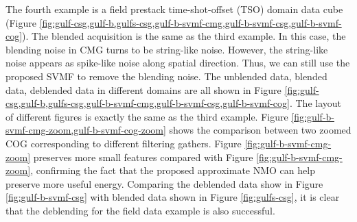 

The fourth example is a field prestack time-shot-offset (TSO) domain data cube (Figure \ref{fig:gulf-csg,gulf-b,gulfs-csg,gulf-b-svmf-cmg,gulf-b-svmf-csg,gulf-b-svmf-cog}).  The blended acquisition is the same as the third example. In this case, the blending noise in CMG turns to be string-like noise. However, the string-like noise appears as spike-like noise along spatial direction. Thus, we can still use the proposed SVMF to remove the blending noise. The unblended data, blended data, deblended data in different domains are all shown in Figure \ref{fig:gulf-csg,gulf-b,gulfs-csg,gulf-b-svmf-cmg,gulf-b-svmf-csg,gulf-b-svmf-cog}. The layout of different figures is exactly the same as the third example. Figure \ref{fig:gulf-b-svmf-cmg-zoom,gulf-b-svmf-cog-zoom} shows the comparison between two zoomed COG corresponding to different filtering gathers. Figure \ref{fig:gulf-b-svmf-cmg-zoom} preserves more small features compared with Figure \ref{fig:gulf-b-svmf-cmg-zoom}, confirming the fact that the proposed approximate NMO can help preserve more useful energy. Comparing the deblended data show in Figure \ref{fig:gulf-b-svmf-csg} with blended data shown in Figure \ref{fig:gulfs-csg}, it is clear that the deblending for the field data example is also successful. 


